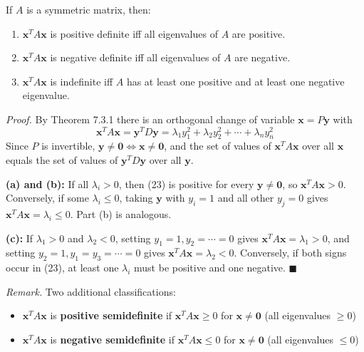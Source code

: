 \documentclass{article}
\begin{document}
\begin{tcolorbox}[colback=red!4, colframe=red!60!black,
  title={\textbf{Theorem 7.3.2}}, boxrule=0.5mm, arc=3mm]
If $A$ is a symmetric matrix, then:
\begin{enumerate}
  \item[(a)] $\mathbf{x}^T A\mathbf{x}$ is positive definite iff all eigenvalues of $A$ are positive.
  \item[(b)] $\mathbf{x}^T A\mathbf{x}$ is negative definite iff all eigenvalues of $A$ are negative.
  \item[(c)] $\mathbf{x}^T A\mathbf{x}$ is indefinite iff $A$ has at least one positive and at least
             one negative eigenvalue.
\end{enumerate}
\end{tcolorbox}

\textit{Proof.} By Theorem 7.3.1 there is an orthogonal change of variable $\mathbf{x}=P\mathbf{y}$ with
\begin{equation}
  \mathbf{x}^T A\mathbf{x} = \mathbf{y}^T D\mathbf{y}
  = \lambda_1y_1^2+\lambda_2y_2^2+\cdots+\lambda_ny_n^2 \tag{23}
\end{equation}
Since $P$ is invertible, $\mathbf{y}\neq\mathbf{0}\Leftrightarrow\mathbf{x}\neq\mathbf{0}$,
and the set of values of $\mathbf{x}^T A\mathbf{x}$ over all $\mathbf{x}$ equals the set of
values of $\mathbf{y}^T D\mathbf{y}$ over all $\mathbf{y}$.

\textbf{(a) and (b):} If all $\lambda_i>0$, then (23) is positive for every $\mathbf{y}\neq\mathbf{0}$,
so $\mathbf{x}^T A\mathbf{x}>0$. Conversely, if some $\lambda_i\le0$, taking $\mathbf{y}$ with
$y_i=1$ and all other $y_j=0$ gives $\mathbf{x}^T A\mathbf{x}=\lambda_i\le0$. Part (b) is
analogous.

\textbf{(c):} If $\lambda_1>0$ and $\lambda_2<0$, setting $y_1=1,y_2=\cdots=0$ gives
$\mathbf{x}^T A\mathbf{x}=\lambda_1>0$, and setting $y_2=1,y_1=y_3=\cdots=0$ gives
$\mathbf{x}^T A\mathbf{x}=\lambda_2<0$. Conversely, if both signs occur in (23), at least one
$\lambda_i$ must be positive and one negative. $\blacksquare$

\textit{Remark.} Two additional classifications:
\begin{itemize}
  \item $\mathbf{x}^T A\mathbf{x}$ is \textbf{positive semidefinite} if $\mathbf{x}^T A\mathbf{x}\ge0$
        for $\mathbf{x}\neq\mathbf{0}$ (all eigenvalues $\ge0$)
  \item $\mathbf{x}^T A\mathbf{x}$ is \textbf{negative semidefinite} if $\mathbf{x}^T A\mathbf{x}\le0$
        for $\mathbf{x}\neq\mathbf{0}$ (all eigenvalues $\le0$)
\end{itemize}
\end{document}
